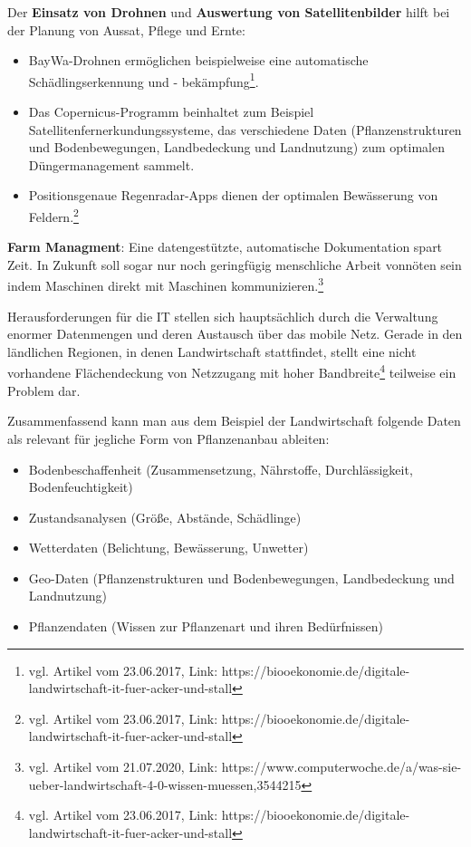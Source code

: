 Der \textbf{Einsatz von Drohnen} und \textbf{Auswertung von
Satellitenbilder} hilft bei der Planung von Aussat, Pflege und Ernte:

\begin{itemize}
\tightlist
\item
  BayWa-Drohnen ermöglichen beispielweise eine automatische
  Schädlingserkennung und - bekämpfung\footnote{vgl. Artikel vom
    23.06.2017, Link:
    https://biooekonomie.de/digitale-landwirtschaft-it-fuer-acker-und-stall}.
\item
  Das Copernicus-Programm beinhaltet zum Beispiel
  Satellitenfernerkundungssysteme, das verschiedene Daten
  (Pflanzenstrukturen und Bodenbewegungen, Landbedeckung und
  Landnutzung) zum optimalen Düngermanagement sammelt.
\item
  Positionsgenaue Regenradar-Apps dienen der optimalen Bewässerung von
  Feldern.\footnote{vgl. Artikel vom 23.06.2017, Link:
    https://biooekonomie.de/digitale-landwirtschaft-it-fuer-acker-und-stall}
\end{itemize}

\textbf{Farm Managment}: Eine datengestützte, automatische Dokumentation
spart Zeit. In Zukunft soll sogar nur noch geringfügig menschliche
Arbeit vonnöten sein indem Maschinen direkt mit Maschinen
kommunizieren.\footnote{vgl. Artikel vom 21.07.2020, Link:
  https://www.computerwoche.de/a/was-sie-ueber-landwirtschaft-4-0-wissen-muessen,3544215}

Herausforderungen für die IT stellen sich hauptsächlich durch die
Verwaltung enormer Datenmengen und deren Austausch über das mobile Netz.
Gerade in den ländlichen Regionen, in denen Landwirtschaft stattfindet,
stellt eine nicht vorhandene Flächendeckung von Netzzugang mit hoher
Bandbreite\footnote{vgl. Artikel vom 23.06.2017, Link:
  https://biooekonomie.de/digitale-landwirtschaft-it-fuer-acker-und-stall}
teilweise ein Problem dar.

Zusammenfassend kann man aus dem Beispiel der Landwirtschaft folgende
Daten als relevant für jegliche Form von Pflanzenanbau ableiten:

\begin{itemize}
\tightlist
\item
  Bodenbeschaffenheit (Zusammensetzung, Nährstoffe, Durchlässigkeit,
  Bodenfeuchtigkeit)
\item
  Zustandsanalysen (Größe, Abstände, Schädlinge)
\item
  Wetterdaten (Belichtung, Bewässerung, Unwetter)
\item
  Geo-Daten (Pflanzenstrukturen und Bodenbewegungen, Landbedeckung und
  Landnutzung)
\item
  Pflanzendaten (Wissen zur Pflanzenart und ihren Bedürfnissen)
\end{itemize}

